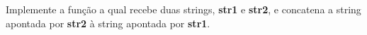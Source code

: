 
\question[10]

Implemente a função a qual recebe duas strings, \textbf{str1} e \textbf{str2}, e concatena a string apontada por \textbf{str2} à string apontada por \textbf{str1}.